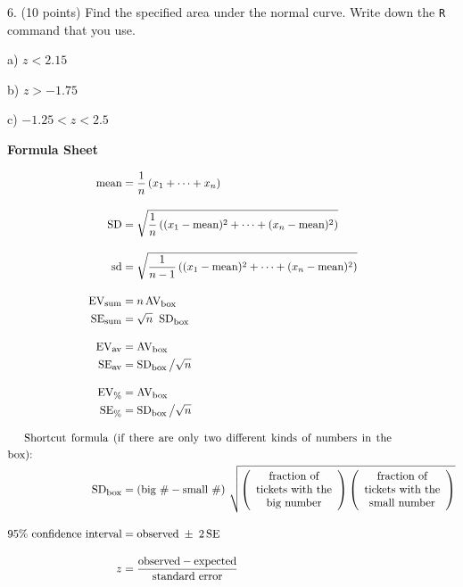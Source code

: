 \documentclass[10pt]{article}
\begin{document}
\eject


6. (10 points) Find the specified area under the normal curve.  Write down the \texttt{R} command that you use.

\hspace{10pt} a) $z<2.15$ 
\bigskip
\bigskip\bigskip\bigskip

\hspace{10pt} b) $z>-1.75$
\bigskip
\bigskip\bigskip\bigskip

\hspace{10pt} c) $-1.25 < z < 2.5$
\vfill



\begin{center}
\textbf{\large Formula Sheet}
\end{center}


\begin{align*}
\mbox{mean} &=\frac{1}{n}\left(x_1 + \cdots + x_n\right)\\[10pt]
\mbox{SD}   &=\sqrt{\frac{1}{n}\left( (x_1 - \mbox{mean})^2 + \cdots + (x_n - \mbox{mean})^2\right)}\\[10pt]
\mbox{sd}   &=\sqrt{\frac{1}{n-1}\left( (x_1 - \mbox{mean})^2 + \cdots + (x_n - \mbox{mean})^2\right)}\\[10pt]
%
\mbox{EV}_{\mbox{\footnotesize sum}} & = n\,\mbox{AV}_{\mbox{\footnotesize box}}\\
\mbox{SE}_{\mbox{\footnotesize sum}} & = \sqrt{n}\;\;\mbox{SD}_{\mbox{\footnotesize box}}\\[10pt]
%
\mbox{EV}_{\mbox{\footnotesize av}} & = \mbox{AV}_{\mbox{\footnotesize box}}\\
\mbox{SE}_{\mbox{\footnotesize av}} & = \mbox{SD}_{\mbox{\footnotesize box}}\,\big{/}\sqrt{n}\\[10pt]
%
\mbox{EV}_{\mbox{\footnotesize \%}} & = \mbox{AV}_{\mbox{\footnotesize box}}\\
\mbox{SE}_{\mbox{\footnotesize \%}} & = \mbox{SD}_{\mbox{\footnotesize box}}\,\big{/}\sqrt{n}\\[10pt]
%
\noalign{Shortcut formula (if there are only two different kinds of numbers in the box):}
\mbox{SD}_{\mbox{\footnotesize box}} &=
  \left(\mbox{big \#} - \mbox{small \#}\right)\,\sqrt{
  \left(\begin{array}{c}\mbox{fraction of}\\ \mbox{tickets with the}\\ \mbox{big number}\end{array}\right)
  \left(\begin{array}{c}\mbox{fraction of}\\\mbox{tickets with the}\\\mbox{small number}\end{array}\right)}\\[10pt]
%
\mbox{95\% confidence interval} &= \mbox{observed} \;\pm\; 2\,\mbox{SE}\\[10pt]
z &= \frac{\mbox{observed} - \mbox{expected}}{\mbox{standard error}}
\end{align*}
\end{document}
